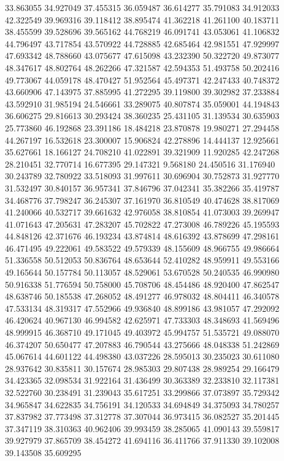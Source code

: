 33.863055
34.927049
37.455315
36.059487
36.614277
35.791083
34.912033
42.322549
39.969316
39.118412
38.895474
41.362218
41.261100
40.183711
38.455599
39.528696
39.565162
44.768219
46.091741
43.053061
41.106832
44.796497
43.717854
43.570922
44.728885
42.685464
42.981551
47.929997
47.693342
48.788660
43.075677
47.615098
43.232390
50.322720
49.873077
48.347617
48.802764
48.262266
47.321587
42.594353
51.493758
50.202416
49.773067
44.059178
48.470427
51.952564
45.497371
42.247433
40.748372
43.660906
47.143975
37.885995
41.272295
39.119800
39.302982
37.233884
43.592910
31.985194
24.546661
33.289075
40.807874
35.059001
44.194843
36.606275
29.816613
30.293424
38.360235
25.431105
31.139534
30.635903
25.773860
46.192868
23.391186
18.484218
23.870878
19.980271
27.294458
44.267197
16.532618
23.300007
15.906824
42.278896
14.444137
12.925661
35.627661
18.166127
24.708210
41.022891
39.321909
11.920285
42.247268
28.210451
32.770714
16.677395
29.147321
9.568180
24.450516
31.176940
30.243789
32.780922
33.518093
31.997611
30.696904
30.752873
31.927770
31.532497
30.840157
36.957341
37.846796
37.042341
35.382266
35.419787
34.468776
37.798247
36.245307
37.161970
36.810549
40.474628
38.817069
41.240066
40.532717
39.661632
42.976058
38.810854
41.073003
39.269947
41.071643
47.205631
47.283207
45.702822
47.273008
46.789226
45.195593
44.848126
42.371676
46.193234
43.874814
48.616392
43.878699
47.298161
46.471495
49.222061
49.583522
49.579339
48.155609
48.966755
49.986664
51.336558
50.512053
50.836764
48.653644
52.410282
48.959911
49.553166
49.165644
50.157784
50.113057
48.529061
53.670528
50.240535
46.990980
50.916338
51.776594
50.758000
45.708706
48.454486
48.920400
47.862547
48.638746
50.185538
47.268052
48.491277
46.978032
48.804411
46.340578
47.533134
48.319317
47.552966
49.936840
48.899186
43.981057
47.292092
46.420624
40.967130
46.994582
42.625971
47.733303
48.348693
41.569496
48.999915
46.368710
49.171045
49.403972
45.994757
51.535721
49.088070
46.374207
50.650477
47.207883
46.790544
43.275666
48.048338
51.242869
45.067614
44.601122
44.498380
43.037226
28.595013
30.235023
30.611080
28.937642
30.835811
30.157674
28.985303
29.807438
28.989254
29.166479
34.423365
32.098534
31.922164
31.436499
30.363389
32.233810
32.117381
32.522760
30.238491
31.239043
35.617251
33.299866
37.073897
35.729342
34.965847
34.622835
34.756191
34.120533
34.694849
34.375093
34.780257
37.837982
37.773498
37.312778
37.307044
36.973415
36.082527
35.201445
37.347119
38.310363
40.962406
39.993459
38.285065
41.090143
39.559817
39.927979
37.865709
38.454272
41.694116
36.411766
37.911330
39.102008
39.143508
35.609295
